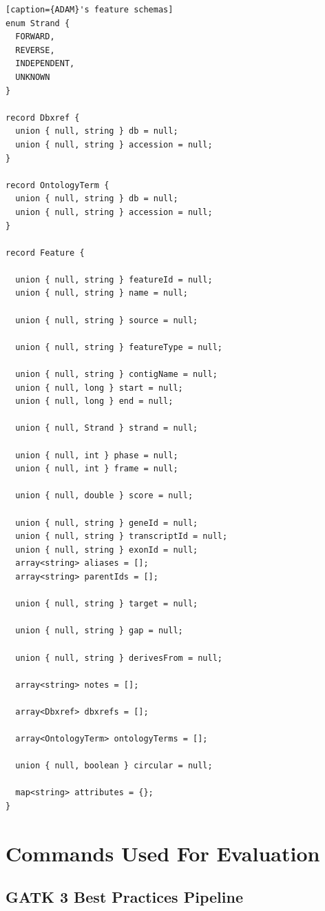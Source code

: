 \documentclass[phd]{ucbthesis}
\begin{document}
\begin{lstlisting}[caption={ADAM}'s feature schemas]
enum Strand {
  FORWARD,
  REVERSE,
  INDEPENDENT,
  UNKNOWN
}

record Dbxref {
  union { null, string } db = null;
  union { null, string } accession = null;
}

record OntologyTerm {
  union { null, string } db = null;
  union { null, string } accession = null;
}

record Feature {

  union { null, string } featureId = null;
  union { null, string } name = null;

  union { null, string } source = null;

  union { null, string } featureType = null;

  union { null, string } contigName = null;
  union { null, long } start = null;
  union { null, long } end = null;

  union { null, Strand } strand = null;

  union { null, int } phase = null;
  union { null, int } frame = null;

  union { null, double } score = null;

  union { null, string } geneId = null;
  union { null, string } transcriptId = null;
  union { null, string } exonId = null;
  array<string> aliases = [];
  array<string> parentIds = [];

  union { null, string } target = null;

  union { null, string } gap = null;

  union { null, string } derivesFrom = null;

  array<string> notes = [];

  array<Dbxref> dbxrefs = [];

  array<OntologyTerm> ontologyTerms = [];

  union { null, boolean } circular = null;

  map<string> attributes = {};
}
\end{lstlisting}

\chapter{Commands Used For Evaluation}
\label{sec:cmds}

\section{GATK 3 Best Practices Pipeline}
\label{sec:gatk-best-practices}
\end{document}
